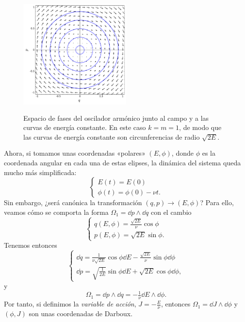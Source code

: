   \begin{figure}[h]
    \centering
    \includegraphics[width=0.5\textwidth]{pics/oscilador}
    \label{fig:oscilador}
    \caption{\small Espacio de fases del oscilador armónico junto al campo y a las curvas de energía constante. En este caso $k=m=1$, de modo que las curvas de energía constante son circunferencias de radio $\sqrt{2E}$.}
  \end{figure}

  Ahora, si tomamos unas coordenadas «polares» $(E,\phi)$, donde $\phi$ es la coordenada angular en cada una de estas elipses, la dinámica del sistema queda mucho más simplificada: 
  \begin{equation*}
    \begin{cases}
    E(t)=E(0) \\
    \phi(t)=\phi(0)-\nu t.
  \end{cases}
  \end{equation*}
  Sin embargo, ¿será canónica la transformación $(q,p) \rightarrow (E,\phi)$? Para ello, veamos cómo se comporta la forma $\Omega_1=\dd p\wedge \dd q$ con el cambio
  \begin{equation*}
    \begin{cases}
      q(E,\phi)=\frac{\sqrt{2E}}{\nu}\cos\phi\\
      p(E,\phi)=\sqrt{2E}\sin \phi.
    \end{cases}
  \end{equation*}
  Tenemos entonces
  \begin{equation*}
    \begin{cases}
      \dd q= \frac{1}{\nu \sqrt{2E}}\cos \phi \dd E - \frac{\sqrt{2E}}{\nu} \sin \phi \dd \phi \\
      \dd p= \sqrt{\frac{1}{2E}}\sin \phi \dd E + \sqrt{2E} \cos \phi \dd \phi,
    \end{cases}
  \end{equation*}
  y 
  \begin{equation*}
    \Omega_1= \dd p \wedge \dd q = -\tfrac{1}{\nu} \dd E \wedge \dd \phi.
  \end{equation*}
  Por tanto, si definimos la \emph{variable de acción}, $J=-\frac{E}{\nu}$, entonces $\Omega_1=\dd J \wedge \dd \phi$ y $(\phi,J)$ son unas coordenadas de Darboux.

